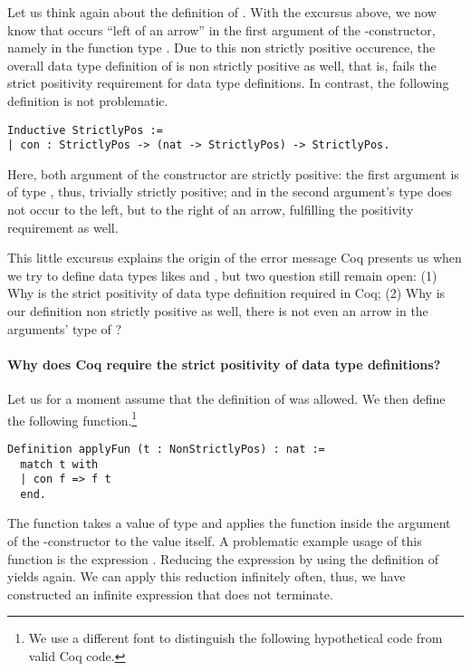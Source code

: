 Let us think again about the definition of .
With the excursus above, we now know that 
occurs ``left of an arrow''  in the first argument of the
-constructor, namely in the function type
.
Due to this non strictly positive occurence, the overall data type
definition of  is non strictly positive as well,
that is, fails the strict positivity requirement for data type
definitions.
In contrast, the following definition is not problematic.

\begin{verbatim}
Inductive StrictlyPos :=
| con : StrictlyPos -> (nat -> StrictlyPos) -> StrictlyPos.
\end{verbatim}

Here, both argument of the constructor  are strictly positive:
the first argument is of type , thus, trivially
strictly positive; and in the second argument's type 
does not occur to the left, but to the right of an arrow, fulfilling
the positivity requirement as well.

This little excursus explains the origin of the error message Coq
presents us when we try to define data types likes
 and , but two question still remain
open: (1) Why is the strict positivity of data type definition
required in Coq; (2) Why is our definition  non strictly
positive as well, there is not even an arrow in the arguments' type of
?

\paragraph{Why does Coq require the strict positivity of data type
  definitions?}

Let us for a moment assume that the definition of
 was allowed.
We then define the following function.\footnote{We use a different
  font to distinguish the following hypothetical code from valid Coq code.}

\begin{verbatim}
Definition applyFun (t : NonStrictlyPos) : nat :=
  match t with
  | con f => f t
  end.
\end{verbatim}

The function  takes a value  of type
 and applies the function  inside the
argument of the -constructor to the value  itself.
A problematic example usage of this function is the expression
.
Reducing the expression by using the definition of  yields
 again.
We can apply this reduction infinitely often, thus, we have
constructed an infinite expression that does not terminate.

